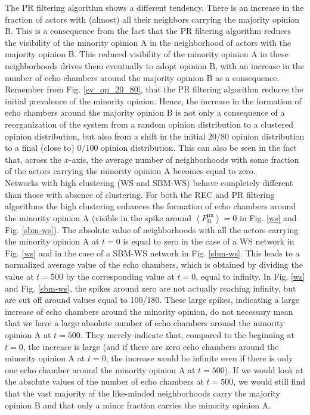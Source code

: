 \documentclass[11 pt , letterpaper , twoside , openright]{book}
\begin{document}
\newline
The PR filtering algorithm shows a different tendency. There is an increase in the fraction of actors with (almost) all their neighbors carrying the majority opinion B. This is a consequence from the fact that the PR filtering algorithm reduces the visibility of the minority opinion A in the neighborhood of actors with the majority opinion B. This reduced visibility of the minority opinion A in these neighborhoods drives them eventually to adopt opinion B, with an increase in the number of echo chambers around the majority opinion B as a consequence. Remember from Fig. \ref{ev_op_20_80}, that the PR filtering algorithm reduces the initial prevalence of the minority opinion. Hence, the increase in the formation of echo chambers around the majority opinion B is not only a consequence of a reorganization of the system from a random opinion distribution to a clustered opinion distribution, but also from a shift in the initial $20/80$ opinion distribution to a final (close to) $0/100$ opinion distribution. This can also be seen in the fact that, across the $x$-axis, the average number of neighborhoods with some fraction of the actors carrying the minority opinion A becomes equal to zero. \\
\newline
Networks with high clustering (WS and SBM-WS) behave completely different than those with absence of clustering. For both the REC and PR filtering algorithms the high clustering enhances the formation of echo chambers around the minority opinion A (visible in the spike around $\left<P_\text{B}^{\text{nn}}\right> = 0$ in Fig. \ref{ws} and Fig. \ref{sbm-ws}). The absolute value of neighborhoods with all the actors carrying the minority opinion A at $t=0$ is equal to zero in the case of a WS network in Fig. \ref{ws} and in the case of a SBM-WS network in Fig. \ref{sbm-ws}. This leads to a normalized average value of the echo chambers, which is obtained by dividing the value at $t=500$ by the corresponding value at $t=0$, equal to infinity. In Fig. \ref{ws} and Fig. \ref{sbm-ws}, the spikes around zero are not actually reaching infinity, but are cut off around values equal to 100/180. These large spikes, indicating a large increase of echo chambers around the minority opinion, do not necessary mean that we have a large absolute number of echo chambers around the minority opinion A at $t=500$. They merely indicate that, compared to the beginning at $t=0$, the increase is large (and if there are zero echo chambers around the minority opinion A at $t=0$, the increase would be infinite even if there is only one echo chamber around the minority opinion A at $t=500$). If we would look at the absolute values of the number of echo chambers at $t=500$, we would still find that the vast majority of the like-minded neighborhoods carry the majority opinion B and that only a minor fraction carries the minority opinion A.\\
\end{document}
